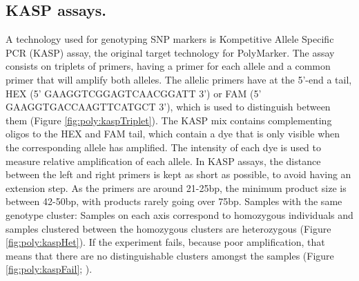 \subsection{KASP assays.}
\label{sub:poly:kasp}
A technology used for genotyping SNP markers is Kompetitive Allele Specific PCR (KASP) assay, the original target technology for PolyMarker.
The assay consists on triplets of primers, having a primer for each allele and a common primer that will amplify both alleles. 
The allelic primers have at the 5'-end a tail, HEX (5' GAAGGTCGGAGTCAACGGATT 3') or FAM (5' GAAGGTGACCAAGTTCATGCT 3'), which is used to distinguish between them (Figure \ref{fig:poly:kaspTriplet}). 
The KASP mix contains complementing oligos to the HEX and FAM tail, which contain a dye that is only visible when the corresponding allele has amplified. 
The intensity of each dye is used to measure relative amplification of each allele. 
In KASP assays, the distance between the left and right primers is kept as short as possible, to avoid having an extension step. 
As the primers are around 21-25bp, the minimum product size is between 42-50bp, with products rarely going over 75bp.  
Samples with the same genotype cluster: Samples on each axis correspond to homozygous individuals and samples clustered between the homozygous clusters are heterozygous (Figure \ref{fig:poly:kaspHet}). 
If the experiment fails, because poor amplification, that means that there are no distinguishable clusters amongst the samples (Figure \ref{fig:poly:kaspFail}; \citealt{LGC}).


